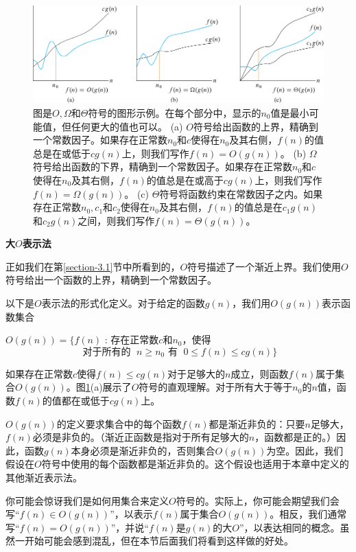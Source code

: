 \documentclass[lang=cn,newtx,10pt,scheme=chinese]{elegantbook}
\begin{document}
\begin{figure}
    \centering
    \includegraphics{算法导论第四版插图/第二章/渐近时间复杂度比较示意图.pdf}
    \caption{图是$O, \Omega$和$\Theta$符号的图形示例。在每个部分中，显示的$n_0$值是最小可能值，但任何更大的值也可以。 (a) $O$符号给出函数的上界，精确到一个常数因子。如果存在正常数$n_0$和$c$使得在$n_0$及其右侧，$f(n)$的值总是在或低于$cg(n)$上，则我们写作$f(n)=O(g(n))$。 (b) $\Omega$符号给出函数的下界，精确到一个常数因子。如果存在正常数$n_0$和$c$使得在$n_0$及其右侧，$f(n)$的值总是在或高于$cg(n)$上，则我们写作$f(n)=\Omega(g(n))$。 (c) $\Theta$符号将函数约束在常数因子之内。如果存在正常数$n_0,c_1$和$c_2$使得在$n_0$及其右侧，$f(n)$的值总是在$c_1g(n)$和$c_2g(n)$之间，则我们写作$f(n)=\Theta(g(n))$。}
    \label{fig:渐近时间复杂度比较示意图}
\end{figure}

\textbf{大$O$表示法}

正如我们在第\ref{section-3.1}节中所看到的，$O$符号描述了一个渐近上界。我们使用$O$符号给出一个函数的上界，精确到一个常数因子。

以下是$O$表示法的形式化定义。对于给定的函数$g(n)$，我们用$O(g(n))$表示函数集合

$O(g(n))=\{f(n)$ : 存在正常数$c$和$n_0$，使得
$$
\text { 对于所有的 }\; n \geq n_0 \text { 有 } \;
0 \leq f(n) \leq c g(n) \}
$$

如果存在正常数$c$使得$f(n) \leq c g(n)$对于足够大的$n$成立，则函数$f(n)$属于集合$O(g(n))$。图\ref{fig:渐近时间复杂度比较示意图}(a)展示了$O$符号的直观理解。对于所有大于等于$n_0$的$n$值，函数$f(n)$的值都在或低于$cg(n)$上。

$O(g(n))$的定义要求集合中的每个函数$f(n)$都是渐近非负的：只要$n$足够大，$f(n)$必须是非负的。（渐近正函数是指对于所有足够大的$n$，函数都是正的。）因此，函数$g(n)$本身必须是渐近非负的，否则集合$O(g(n))$为空。因此，我们假设在$O$符号中使用的每个函数都是渐近非负的。这个假设也适用于本章中定义的其他渐近表示法。

你可能会惊讶我们是如何用集合来定义$O$符号的。实际上，你可能会期望我们会写``$f(n) \in O(g(n))$''，以表示$f(n)$属于集合$O(g(n))$。相反，我们通常写``$f(n)=O(g(n))$''，并说``$f(n)$是$g(n)$的大$O$''，以表达相同的概念。虽然一开始可能会感到混乱，但在本节后面我们将看到这样做的好处。
\end{document}
